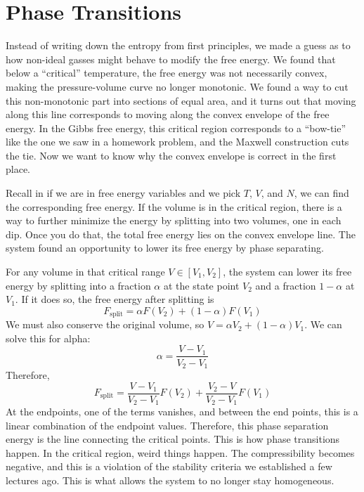\documentclass[a4paper,twoside,master.tex]{subfiles}
\begin{document}

\section{Phase Transitions}
\label{sec:phase_transitions}

Instead of writing down the entropy from first principles, we made a guess as to how non-ideal gasses might behave to modify the free energy. We found that below a ``critical'' temperature, the free energy was not necessarily convex, making the pressure-volume curve no longer monotonic. We found a way to cut this non-monotonic part into sections of equal area, and it turns out that moving along this line corresponds to moving along the convex envelope of the free energy. In the Gibbs free energy, this critical region corresponds to a ``bow-tie'' like the one we saw in a homework problem, and the Maxwell construction cuts the tie. Now we want to know why the convex envelope is correct in the first place.


Recall in if we are in free energy variables and we pick $ T $, $ V $, and $ N $, we can find the corresponding free energy. If the volume is in the critical region, there is a way to further minimize the energy by splitting into two volumes, one in each dip. Once you do that, the total free energy lies on the convex envelope line. The system found an opportunity to lower its free energy by phase separating.


For any volume in that critical range $ V \in [V_1, V_2] $, the system can lower its free energy by splitting into a fraction $\alpha$ at the state point $ V_2 $ and a fraction $ 1 - \alpha $ at $ V_1 $. If it does so, the free energy after splitting is
\begin{equation}
    F_{\text{split}} = \alpha F(V_2) + (1 - \alpha) F(V_1)
\end{equation}
We must also conserve the original volume, so $ V = \alpha V_2 + (1 - \alpha) V_1 $. We can solve this for alpha:
\begin{equation}
    \alpha = \frac{V - V_1}{V_2 - V_1}
\end{equation}
Therefore,
\begin{equation}
    F_{\text{split}} = \frac{V - V_1}{V_2 - V_1} F(V_2) + \frac{V_2 - V}{V_2 - V_1} F(V_1)
\end{equation}
At the endpoints, one of the terms vanishes, and between the end points, this is a linear combination of the endpoint values. Therefore, this phase separation energy is the line connecting the critical points. This is how phase transitions happen. In the critical region, weird things happen. The compressibility becomes negative, and this is a violation of the stability criteria we established a few lectures ago. This is what allows the system to no longer stay homogeneous.
\end{document}

